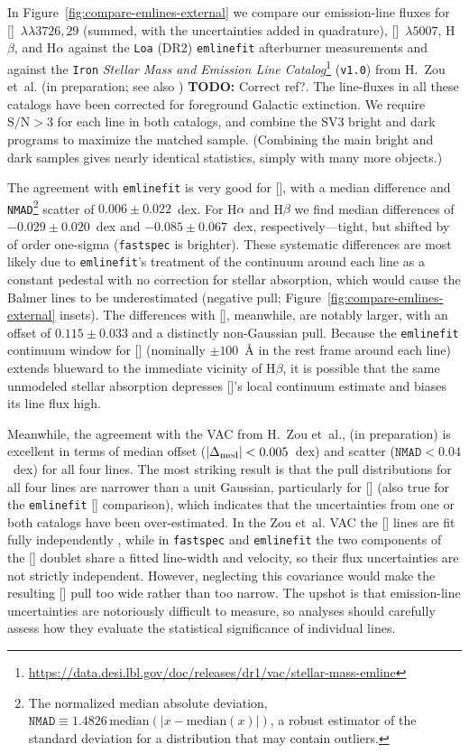 \documentclass[modern,linenumbers]{aastex701}
\newcommand{\todo}[1]{{\color{red}\textbf{TODO:} #1}}
\newcommand{\fastspec}{\texttt{fastspec}}
\newcommand{\oii}{[\ion{O}{2}]}
\newcommand{\oiii}{[\ion{O}{3}]}
\newcommand{\ha}{H\ensuremath{\alpha}}
\newcommand{\hb}{H\ensuremath{\beta}}
\newcommand{\oiiilam}{[\ion{O}{3}]~$\lambda5007$}
\newcommand{\oiidoublet}{[\ion{O}{2}]~$\lambda\lambda3726,29$}
\begin{document}
In Figure~\ref{fig:compare-emlines-external} we compare our
emission-line fluxes for \oiidoublet{} (summed, with the uncertainties
added in quadrature), \oiiilam, \hb, and \ha{} against the
\texttt{Loa} (DR2) \texttt{emlinefit} afterburner measurements
\citep{raichoor23a} and against the \texttt{Iron} \citep[DESI
  DR1;][]{desi-collaboration26a} \textit{Stellar Mass and Emission
  Line
  Catalog}\footnote{\url{https://data.desi.lbl.gov/doc/releases/dr1/vac/stellar-mass-emline}}
(\texttt{v1.0}) from H.~Zou et~al. (in preparation; see also
\citealt{zou24b, sui26a}) \todo{Correct ref?}. The line-fluxes in all
these catalogs have been corrected for foreground Galactic
extinction. We require $\mathrm{S/N}>3$ for each line in both
catalogs, and combine the SV3 bright and dark programs to maximize the
matched sample. (Combining the main bright and dark samples gives
nearly identical statistics, simply with many more objects.)

The agreement with \texttt{emlinefit} is very good for \oii, with a
median difference and \texttt{NMAD}\footnote{The normalized median
absolute deviation,
$\mathtt{NMAD}\equiv1.4826\,\mathrm{median}(|x-\mathrm{median}(x)|)$,
a robust estimator of the standard deviation for a distribution that
may contain outliers.} scatter of $0.006\pm0.022$~dex. For \ha{} and
\hb{} we find median differences of $-0.029\pm0.020$~dex and
$-0.085\pm0.067$~dex, respectively---tight, but shifted by of order
one-sigma (\fastspec{} is brighter). These systematic differences are
most likely due to \texttt{emlinefit}'s treatment of the continuum
around each line as a constant pedestal with no correction for stellar
absorption, which would cause the Balmer lines to be underestimated
(negative pull; Figure~\ref{fig:compare-emlines-external} insets). The
differences with \oiii, meanwhile, are notably larger, with an offset
of $0.115\pm0.033$ and a distinctly non-Gaussian pull. Because the
\texttt{emlinefit} continuum window for \oiii{} (nominally
$\pm100$~\AA{} in the rest frame around each line) extends blueward to
the immediate vicinity of \hb, it is possible that the same unmodeled
stellar absorption depresses \oiii{}'s local continuum estimate and
biases its line flux high.

Meanwhile, the agreement with the VAC from H.~Zou et~al., (in
preparation) is excellent in terms of median offset ($|\Delta_{\rm
  med}|<0.005$~dex) and scatter ($\mathtt{NMAD}<0.04$~dex) for all
four lines. The most striking result is that the pull distributions
for all four lines are narrower than a unit Gaussian, particularly for
\oii{} (also true for the \texttt{emlinefit} \oii{} comparison), which
indicates that the uncertainties from one or both catalogs have been
over-estimated. In the Zou et~al. VAC the \oii{} lines are fit fully
independently \citep{zou24b}, while in \fastspec{} and
\texttt{emlinefit} the two components of the \oii{} doublet share a
fitted line-width and velocity, so their flux uncertainties are not
strictly independent. However, neglecting this covariance would make
the resulting \oii{} pull too wide rather than too narrow. The upshot
is that emission-line uncertainties are notoriously difficult to
measure, so analyses should carefully assess how they evaluate the
statistical significance of individual lines.
\end{document}

